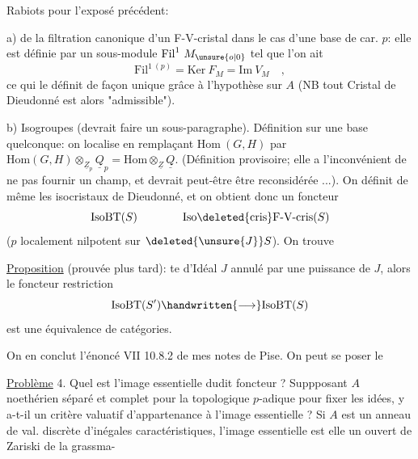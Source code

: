 Rabiots pour l'exposé précédent:

a)  de la filtration canonique d'un F-V-cristal dans
le cas d'une base  \handwritten{(}de car. $p$\handwritten{)}: elle est définie par un sous-module
$\mathrm{Fil}^{1}\ M_{\unsure{o|0}}$  tel que l'on ait
\[
\mathrm{Fil}^{1\ (p)}=\mathrm{Ker}\ F_M=\mathrm{Im}\ V_M\quad ,
\]
ce qui le définit de façon unique grâce à l'hypothèse sur $A$ (NB tout
Cristal de Dieudonné est alors "admissible").

b) Isogroupes  (devrait faire un sous-paragraphe). Définition
sur une base quelconque: on localise  en remplaçant
$\mathrm{Hom}\ (G,H)$ par $\mathrm{Hom}(G,H)\otimes_{\underline Z_p}\underline Q_p=\mathrm{Hom}\otimes_{\underline Z}\underline Q$. (Définition provisoire; elle
 a l'inconvénient de ne pas fournir un champ, et devrait
peut-être être reconsidérée ...). On définit de même les isocristaux
de Dieudonné, et on obtient donc un foncteur
\[
\mathrm{IsoBT}(S)\qquad\qquad\mathrm{Iso}\deleted{\mathrm{cris}}\text{F-V-cris}(S)
\]
($p$ localement nilpotent sur $\deleted{\unsure{J}}S$). On trouve

\uline{Proposition} (prouvée plus tard):  te d'Idéal $J$ annulé par une puissance de
$J$, alors le foncteur restriction
\[
\mathrm{IsoBT}(S')\handwritten{\longrightarrow}\mathrm{IsoBT}(S)
\]
est une équivalence de catégories.

On en conclut l'énoncé VII 10.8.2 de mes notes de Pise.
On peut se poser le 

\uline{Problème} 4. Quel est l'image essentielle dudit foncteur ? Suppposant
$A$ noethérien séparé et complet pour la topologique $p$-adique pour fixer
les idées, y a-t-il un critère valuatif d'appartenance à l'image essentielle ? Si $A$ est un anneau de val. discrète \deleted{\unsure{(}}d'inégales caractéristiques, l'image essentielle est elle un ouvert de Zariski de la grassma-

